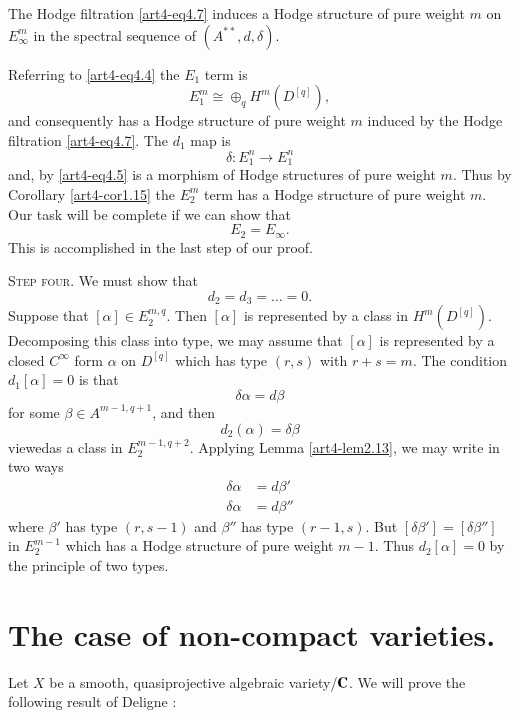\setcounter{lemma}{7}
\begin{lemma}\label{art4-lem4.8}
The Hodge filtration \eqref{art4-eq4.7} induces a Hodge structure of pure weight $m$ on $E^m_\infty$ in the spectral sequence of $(A^{\ast\ast}, d, \delta)$.
\end{lemma}

Referring to \eqref{art4-eq4.4} the $E_1$ term is 
$$
E^m_1 \cong \oplus_q H^m (D^{[q]}),
$$
and consequently has a Hodge structure of pure weight $m$ induced by the Hodge filtration \eqref{art4-eq4.7}. The $d_1$ map is
$$
\delta : E^n _1 \to E^n_1
$$
and, by \eqref{art4-eq4.5} is a morphism of Hodge structures of pure weight $m$. Thus by Corollary \eqref{art4-cor1.15} the $E^m_2$ term has a Hodge structure of pure weight $m$. Our task will be complete if we can show that 
\setcounter{equation}{8}
\begin{equation}
E_2 = E_\infty.
\label{art4-eq4.9}
\end{equation}
This is accomplished in the last step of our proof.

\textsc{Step four.} We must show that 
$$
d_2 = d_3 = \ldots = 0.
$$
Suppose that $[\alpha] \in E^{m,q}_2$. Then $[\alpha]$ is represented by a class in $H^m (D^{[q]})$. Decomposing this class into type, we may assume that $[\alpha]$ is represented by a closed $C^\infty$ form $\alpha$ on $D^{[q]}$ which has type $(r,s)$ with $r + s = m$.  The condition $d_1 [\alpha] =0$ is that
\begin{equation}
\label{art4-eq4.10}
\delta \alpha = d \beta 
\end{equation}
for some $\beta\in A^{m-1, q+1}$, and then 
$$
d_2 (\alpha) = \delta \beta
$$
viewed\pageoriginale as a class in $E^{m-1, q+2}_2$. Applying Lemma \eqref{art4-lem2.13}, we may write in two ways
\begin{align*}
\delta \alpha & = d \beta'\\
\delta \alpha & = d \beta''
\end{align*}
where $\beta'$ has type $(r, s-1)$ and $\beta''$ has type $(r-1, s)$. But $[\delta \beta'] = [\delta \beta'']$ in $E^{m-1}_2$ which has a Hodge structure of pure weight $m-1$. Thus $d_2 [\alpha] = 0$ by the principle of two types.

\section{The case of non-compact varieties.}\label{art4-sec5}
Let $X$ be a smooth, quasiprojective algebraic variety/$\mathbf{C}$. We will prove the following result of Deligne \cite{art4-key13}:

